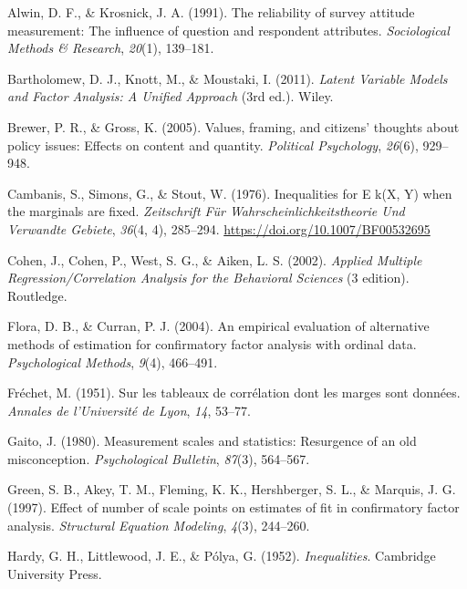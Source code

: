 \documentclass[
  12pt,
]{article}
\newlength{\cslhangindent}
\newenvironment{CSLReferences}[2] %
 {\begin{list}{}{%
  \setlength{\itemindent}{0pt}
  \setlength{\leftmargin}{0pt}
  \setlength{\parsep}{0pt}
  \ifodd #1
   \setlength{\leftmargin}{\cslhangindent}
   \setlength{\itemindent}{-1\cslhangindent}
  \fi
  \setlength{\itemsep}{#2\baselineskip}}}
 {\end{list}}
\theoremstyle{plain}
\theoremstyle{definition}
\theoremstyle{remark}
\begin{document}
\label{refs}
\begin{CSLReferences}{1}{0}
Alwin, D. F., \& Krosnick, J. A. (1991). The reliability of survey
attitude measurement: {The} influence of question and respondent
attributes. \emph{Sociological Methods \& Research}, \emph{20}(1),
139--181.

Bartholomew, D. J., Knott, M., \& Moustaki, I. (2011). \emph{Latent
{Variable Models} and {Factor Analysis}: {A Unified Approach}} (3rd
ed.). Wiley.

Brewer, P. R., \& Gross, K. (2005). Values, framing, and citizens'
thoughts about policy issues: {Effects} on content and quantity.
\emph{Political Psychology}, \emph{26}(6), 929--948.

Cambanis, S., Simons, G., \& Stout, W. (1976). Inequalities for {E}
k({X}, {Y}) when the marginals are fixed. \emph{Zeitschrift Für
Wahrscheinlichkeitstheorie Und Verwandte Gebiete}, \emph{36}(4, 4),
285--294. \url{https://doi.org/10.1007/BF00532695}

Cohen, J., Cohen, P., West, S. G., \& Aiken, L. S. (2002). \emph{Applied
{Multiple Regression}/{Correlation Analysis} for the {Behavioral
Sciences}} (3 edition). Routledge.

Flora, D. B., \& Curran, P. J. (2004). An empirical evaluation of
alternative methods of estimation for confirmatory factor analysis with
ordinal data. \emph{Psychological Methods}, \emph{9}(4), 466--491.

Fréchet, M. (1951). Sur les tableaux de corrélation dont les marges sont
données. \emph{Annales de l'Université de Lyon}, \emph{14}, 53--77.

Gaito, J. (1980). Measurement scales and statistics: {Resurgence} of an
old misconception. \emph{Psychological Bulletin}, \emph{87}(3),
564--567.

Green, S. B., Akey, T. M., Fleming, K. K., Hershberger, S. L., \&
Marquis, J. G. (1997). Effect of number of scale points on estimates of
fit in confirmatory factor analysis. \emph{Structural Equation
Modeling}, \emph{4}(3), 244--260.

Hardy, G. H., Littlewood, J. E., \& Pólya, G. (1952).
\emph{Inequalities}. Cambridge University Press.


\end{CSLReferences}
\end{document}
